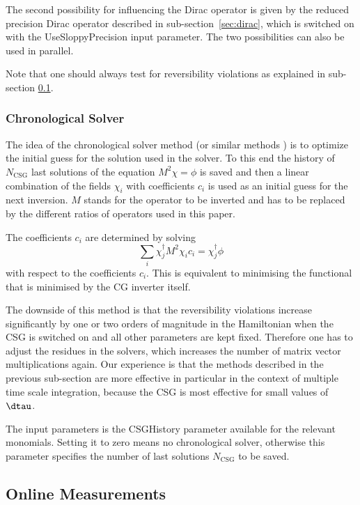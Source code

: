 The second possibility for influencing the Dirac operator is given by
the reduced precision Dirac operator described in
sub-section~\ref{sec:dirac}, which is switched on with the {\ttfamily
  UseSloppyPrecision} input parameter. The two possibilities can also
be used in parallel.

Note that one should always test for reversibility violations as
explained in sub-section \ref{sec:online}.

\subsubsection{Chronological Solver}

The idea of the chronological solver method (or similar methods
\cite{Brower:1994er}) is to optimize the initial guess for
the solution used in the solver. To this end the history of
$N_\mathrm{CSG}$ last solutions of the equation $M^2 \chi = \phi$ is
saved and then a linear combination of the fields $\chi_i$ with
coefficients $c_i$ is used as an initial guess for the next
inversion. $M$ stands for the operator to be inverted and has to be
replaced by the different ratios of operators used in this paper.

The coefficients $c_i$ are determined by solving
\begin{equation}
  \label{eq:chrono}
  \sum_i \chi_j^\dagger M^2 \chi_i c_i = \chi_j^\dagger \phi
\end{equation}
with respect to the coefficients $c_i$. This is equivalent to
minimising the functional that is minimised by the CG inverter
itself.

The downside of this method is that the reversibility violations
increase significantly by one or two orders of magnitude in the
Hamiltonian when the CSG is switched on and all other parameters are
kept fixed. Therefore one has to adjust the residues in the solvers,
which increases the number of matrix vector multiplications again.
Our experience is that the methods described in the previous
sub-section are more effective in particular in the context of
multiple time scale integration, because the CSG is most effective for
small values of $\dtau$.

The input parameters is the {\ttfamily CSGHistory} parameter
available for the relevant monomials. Setting it to zero means no
chronological solver, otherwise this parameter specifies the number of
last solutions $N_\mathrm{CSG}$ to be saved.

\subsection{Online Measurements}
\label{sec:online}

